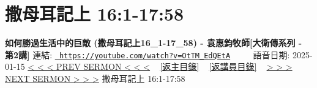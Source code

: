 \documentclass{book}
\begin{document}
\section{撒母耳記上 16:1-17:58}
\label{sec:OtTM_EdQEtA}
\textbf{如何勝過生活中的巨敵 (撒母耳記上16\_1-17\_58) - 袁惠鈞牧師[大衛傳系列 - 第2講]}
\newline
\newline
連結: \href{https://youtube.com/watch?v=OtTM_EdQEtA}{\texttt{ https://youtube.com/watch?v=OtTM\_EdQEtA}} ~~~~ 語音日期: 2025-01-15 
\newline
\newline
\hyperref[sec:wiDRWRXrtjM]{< < < PREV SERMON < < <}
~
\hyperlink{toc}{[返主目錄]}
~
\hyperref[ch:preacher6]{[返講員目錄]}
~
\hyperref[sec:9t69tF6ci0k]{> > > NEXT SERMON > > >}
\newline
\newline
撒母耳記上 16:1-17:58
\newline
\end{document}
